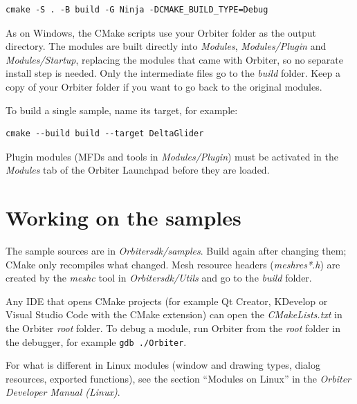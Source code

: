 \documentclass[a4paper]{article}
\begin{document}
\begin{verbatim}
cmake -S . -B build -G Ninja -DCMAKE_BUILD_TYPE=Debug
\end{verbatim}

As on Windows, the CMake scripts use your Orbiter folder as the output directory. The modules are built directly into \textit{Modules}, \textit{Modules/Plugin} and \textit{Modules/Startup}, replacing the modules that came with Orbiter, so no separate install step is needed. Only the intermediate files go to the \textit{build} folder. Keep a copy of your Orbiter folder if you want to go back to the original modules.

To build a single sample, name its target, for example:

\begin{verbatim}
cmake --build build --target DeltaGlider
\end{verbatim}

Plugin modules (MFDs and tools in \textit{Modules/Plugin}) must be activated in the \textit{Modules} tab of the Orbiter Launchpad before they are loaded.

\section{Working on the samples}
The sample sources are in \textit{Orbitersdk/samples}. Build again after changing them; CMake only recompiles what changed. Mesh resource headers (\textit{meshres*.h}) are created by the \textit{meshc} tool in \textit{Orbitersdk/Utils} and go to the \textit{build} folder.

Any IDE that opens CMake projects (for example Qt Creator, KDevelop or Visual Studio Code with the CMake extension) can open the \textit{CMakeLists.txt} in the Orbiter \textit{root} folder. To debug a module, run Orbiter from the \textit{root} folder in the debugger, for example \texttt{gdb ./Orbiter}.

For what is different in Linux modules (window and drawing types, dialog resources, exported functions), see the section ``Modules on Linux'' in the \textit{Orbiter Developer Manual (Linux)}.
\end{document}
